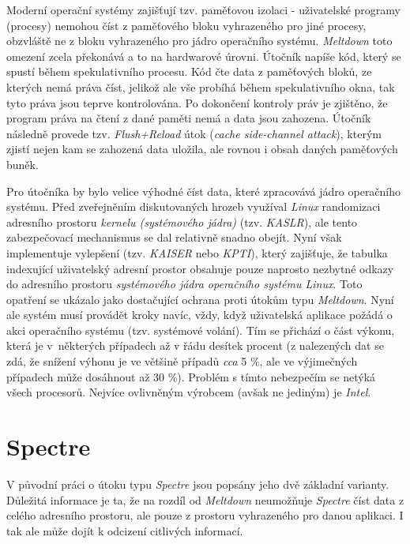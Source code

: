 Moderní operační systémy zajišťují tzv. paměťovou izolaci - uživatelské programy (procesy) nemohou číst z paměťového bloku vyhrazeného pro jiné procesy, obzvláště ne z bloku vyhrazeného pro jádro operačního systému.
\textit{Meltdown} toto omezení zcela překonává a to na hardwarové úrovni.
Útočník napíše kód, který se spustí během spekulativního procesu.
Kód čte data z paměťových bloků, ze kterých nemá práva číst, jelikož ale vše probíhá během spekulativního okna, tak tyto práva jsou teprve kontrolována.
Po dokončení kontroly práv je zjištěno, že program práva na čtení z dané paměti nemá a data jsou zahozena.
Útočník následně provede tzv. \textit{Flush+Reload} útok (\textit{cache side-channel attack}), kterým zjistí nejen kam se zahozená data uložila, ale rovnou i obsah daných paměťových buněk.

Pro útočníka by bylo velice výhodné číst data, které zpracovává jádro operačního systému.
Před zveřejněním diskutovaných hrozeb využíval \textit{Linux} randomizaci adresního prostoru \textit{kernelu (systémového jádra)} (tzv. \textit{KASLR}), ale tento zabezpečovací mechanismus se dal relativně snadno obejít.
Nyní však implementuje vylepšení (tzv. \textit{KAISER} nebo \textit{KPTI}), který zajišťuje, že tabulka indexující uživatelský adresní prostor obsahuje pouze naprosto nezbytné odkazy do adresního prostoru \textit{systémového jádra operačního systému Linux}.
Toto opatření se ukázalo jako dostačující ochrana proti útokům typu \textit{Meltdown}.
Nyní ale systém musí provádět kroky navíc, vždy, když uživatelská aplikace požádá o akci operačního systému (tzv. systémové volání).
Tím se přichází o část výkonu, která je v~některých případech až v řádu desítek procent (z nalezených dat se zdá, že snížení výhonu je ve většině případů \textit{cca} 5 \%, ale ve výjimečných případech může dosáhnout až 30 \%).
Problém s tímto nebezpečím se netýká všech procesorů.
Nejvíce ovlivněným výrobcem (avšak ne jediným) je \textit{Intel}.

\section{Spectre}

V původní práci o útoku typu \textit{Spectre} jsou popsány jeho dvě základní varianty.
Důležitá informace je ta, že na rozdíl od \textit{Meltdown} neumožňuje \textit{Spectre} číst data z celého adresního prostoru, ale pouze z prostoru vyhrazeného pro danou aplikaci.
I tak ale může dojít k odcizení citlivých informací.


